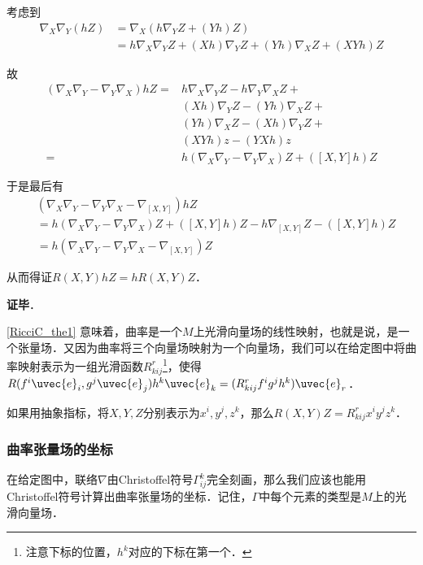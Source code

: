 考虑到
\begin{equation}
\begin{aligned}
\nabla_X\nabla_Y(hZ)&=\nabla_X(h\nabla_YZ+(Yh)Z)\\
&=h\nabla_X\nabla_YZ+(Xh)\nabla_YZ+(Yh)\nabla_XZ+(XYh)Z
\end{aligned}
\end{equation}

故
\begin{equation}
\begin{aligned}
(\nabla_X\nabla_Y-\nabla_Y\nabla_X)hZ=& h\nabla_X\nabla_YZ-h\nabla_Y\nabla_XZ+\\&(Xh)\nabla_YZ-(Yh)\nabla_XZ+\\&(Yh)\nabla_XZ-(Xh)\nabla_YZ+\\&(XYh)z-(YXh)z\\
=& h(\nabla_X\nabla_Y-\nabla_Y\nabla_X)Z+([X, Y]h)Z
\end{aligned}
\end{equation}

于是最后有
\begin{equation}
\begin{aligned}
&(\nabla_X\nabla_Y-\nabla_Y\nabla_X-\nabla_{[X, Y]})hZ\\
&=h(\nabla_X\nabla_Y-\nabla_Y\nabla_X)Z+([X, Y]h)Z-h\nabla_{[X, Y]}Z-([X, Y]h)Z\\
&=h(\nabla_X\nabla_Y-\nabla_Y\nabla_X-\nabla_{[X, Y]})Z
\end{aligned}
\end{equation}

从而得证$R(X, Y)hZ=hR(X, Y)Z$．

\textbf{证毕}．

\autoref{RicciC_the1} 意味着，曲率是一个$M$上光滑向量场的线性映射，也就是说，是一个张量场．又因为曲率将三个向量场映射为一个向量场，我们可以在给定图中将曲率映射表示为一组光滑函数$R^r_{kij}$\footnote{注意下标的位置，$h^k$对应的下标在第一个．}，使得$R(f^i\uvec{e}_i, g^j\uvec{e}_j)h^k\uvec{e}_k=(R^r_{kij}f^ig^jh^k)\uvec{e}_r$．

如果用抽象指标，将$X, Y, Z$分别表示为$x^i, y^j, z^k$，那么$R(X, Y)Z=R^r_{kij}x^iy^jz^k$．


\subsubsection{曲率张量场的坐标}

在给定图中，联络$\nabla$由Christoffel符号$\Gamma^k_{ij}$完全刻画，那么我们应该也能用Christoffel符号计算出曲率张量场的坐标．记住，$\Gamma$中每个元素的类型是$M$上的光滑向量场．

